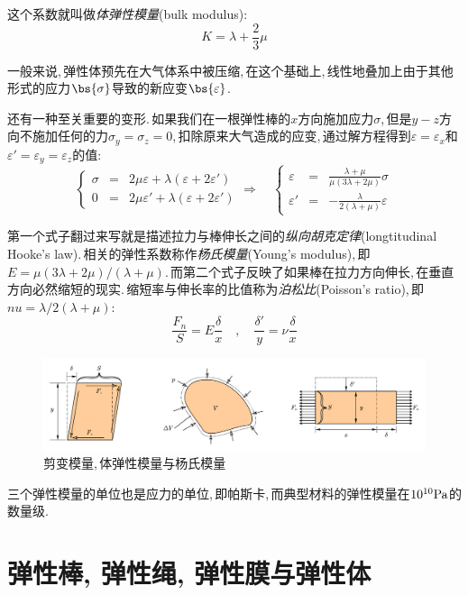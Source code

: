 这个系数就叫做\emph{体弹性模量}(bulk modulus):
\[K=\lambda+\frac{2}{3}\mu\]

一般来说,\,弹性体预先在大气体系中被压缩,\,在这个基础上,\,线性地叠加上由于其他形式的应力$\bs{\sigma}$导致的新应变$\bs{\varepsilon}$.\,

还有一种至关重要的变形.\,如果我们在一根弹性棒的$x$方向施加应力$\sigma$,\,但是$y-z$方向不施加任何的力$\sigma_y=\sigma_z=0$,\,扣除原来大气造成的应变,\,通过解方程得到$\varepsilon=\varepsilon_x$和$\varepsilon'=\varepsilon_y=\varepsilon_z$的值:
\[\left\{\begin{array}{ccc}\sigma &=&2\mu\varepsilon + \lambda(\varepsilon+2\varepsilon') \\ 0 &=&2\mu\varepsilon' + \lambda(\varepsilon+2\varepsilon')\end{array}\right.\Rightarrow\quad \left\{\begin{array}{ccc}\varepsilon &=& \frac{\lambda+\mu}{\mu(3\lambda+2\mu)} \sigma\\ \varepsilon' &=&-\frac{\lambda}{2(\lambda+\mu)}\varepsilon\end{array}\right.\]

第一个式子翻过来写就是描述拉力与棒伸长之间的\emph{纵向胡克定律}(longtitudinal Hooke's law).\,相关的弹性系数称作\emph{杨氏模量}(Young's modulus),\,即$E=\mu(3\lambda+2\mu)/(\lambda+\mu)$.\,而第二个式子反映了如果棒在拉力方向伸长,\,在垂直方向必然缩短的现实.\,缩短率与伸长率的比值称为\emph{泊松比}(Poisson's ratio),\,即$nu=\lambda/2(\lambda+\mu)$:
\[\frac{F_n}{S}=E\frac{\delta}{x}\quad ,\quad \frac{\delta'}{y}=\nu\frac{\delta}{x}\]

\begin{figure}[H]
\centering
\includegraphics[width=14cm]{image/6-7-3.png}
\caption{剪变模量,\,体弹性模量与杨氏模量}
\end{figure}

三个弹性模量的单位也是应力的单位,\,即帕斯卡,\,而典型材料的弹性模量在$10^{10}{\rm Pa}$的数量级.


\section{弹性棒, 弹性绳, 弹性膜与弹性体}

